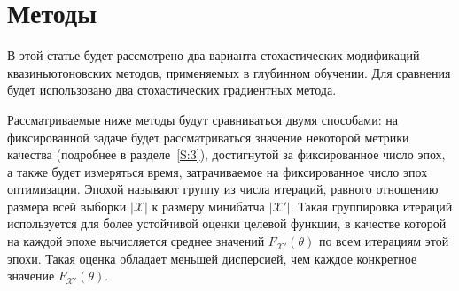 \documentclass[preprint,12pt]{elsarticle}
\begin{document}
\section{Методы}
\label{S:2}
В этой статье будет рассмотрено два варианта стохастических модификаций квазиньютоновских методов, применяемых в глубинном обучении. Для сравнения будет использовано два стохастических градиентных метода.

Рассматриваемые ниже методы будут сравниваться двумя способами: на фиксированной задаче будет рассматриваться значение некоторой метрики качества (подробнее в разделе~\ref{S:3}), достигнутой за фиксированное число эпох, а также будет измеряться время, затрачиваемое на фиксированное число эпох оптимизации. 
Эпохой называют группу из числа итераций, равного отношению размера всей выборки $|\mathcal{X}|$ к размеру минибатча $|\mathcal{X}'|$. Такая группировка итераций используется для более устойчивой оценки целевой функции, в качестве которой на каждой эпохе вычисляется среднее значений $F_{\mathcal{X}'}(\theta)$ по всем итерациям этой эпохи. Такая оценка обладает меньшей дисперсией, чем каждое конкретное значение $F_{\mathcal{X}'}(\theta)$.
\end{document}
